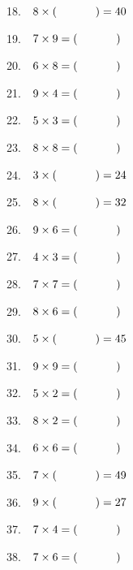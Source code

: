 \documentclass[a4paper]{extarticle}
\begin{document}
\begin{multicols}{3}
18. \,\, $8 \times (\hspace{1.2cm}) = 40$

19. \,\, $7 \times 9 = (\hspace{1.2cm})$

20. \,\, $6 \times 8 = (\hspace{1.2cm})$

21. \,\, $9 \times 4 = (\hspace{1.2cm})$

22. \,\, $5 \times 3 = (\hspace{1.2cm})$

23. \,\, $8 \times 8 = (\hspace{1.2cm})$

24. \,\, $3 \times (\hspace{1.2cm}) = 24$

25. \,\, $8 \times (\hspace{1.2cm}) = 32$

26. \,\, $9 \times 6 = (\hspace{1.2cm})$

27. \,\, $4 \times 3 = (\hspace{1.2cm})$

28. \,\, $7 \times 7 = (\hspace{1.2cm})$

29. \,\, $8 \times 6 = (\hspace{1.2cm})$

30. \,\, $5 \times (\hspace{1.2cm}) = 45$

31. \,\, $9 \times 9 = (\hspace{1.2cm})$

32. \,\, $5 \times 2 = (\hspace{1.2cm})$

33. \,\, $8 \times 2 = (\hspace{1.2cm})$

\columnbreak

34. \,\, $6 \times 6 = (\hspace{1.2cm})$

35. \,\, $7 \times (\hspace{1.2cm}) = 49$

36. \,\, $9 \times (\hspace{1.2cm}) = 27$

37. \,\, $7 \times 4 = (\hspace{1.2cm})$

38. \,\, $7 \times 6 = (\hspace{1.2cm})$


\end{multicols}
\end{document}
